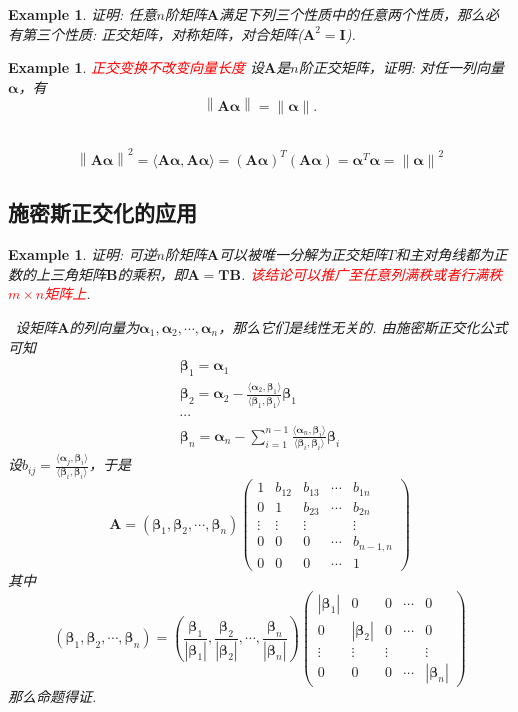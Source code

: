 \documentclass{article}
\newtheorem{example}[theorem]{Example}
\newcommand{\norm}[1]{\left\lVert#1\right\rVert} %
\newcommand{\hints}{{\color{blue} \text{hints}}}
\newcommand{\mbf}[1]{\bm{#1}}
\newcommand\inp[2]{\langle #1, #2 \rangle} %
\newcommand{\redt}[1]{\textcolor{red}{#1}}
\begin{document}
\begin{example}
\rm 证明: 任意$n$阶矩阵$\mbf{A}$满足下列三个性质中的任意两个性质，那么必有第三个性质: 正交矩阵，对称矩阵，对合矩阵($\mbf{A}^2 = \mbf{I}$). 
\end{example}

\begin{example}
\rm \redt{正交变换不改变向量长度} 设$\mbf{A}$是$n$阶正交矩阵，证明: 对任一列向量$\mbf{\alpha}$，有
$$
\norm{\mbf{A}\mbf{\alpha}} = \norm{\mbf{\alpha}}.
$$

\hints\ 
$$
\norm{\mbf{A}\mbf{\alpha}}^2 = \inp{\mbf{A}\mbf{\alpha}}{\mbf{A}\mbf{\alpha}} = (\mbf{A}\mbf{\alpha})^T(\mbf{A}\mbf{\alpha}) = \mbf{\alpha}^T\mbf{\alpha} = \norm{\mbf{\alpha}}^2
$$
\end{example}

\subsection{施密斯正交化的应用}
\begin{example}
\rm 证明: 可逆$n$阶矩阵$\mbf{A}$可以被唯一分解为正交矩阵$T$和主对角线都为正数的上三角矩阵$\mbf{B}$的乘积，即$\mbf{A} = \mbf{T}\mbf{B}$. \redt{该结论可以推广至任意列满秩或者行满秩$m \times n$矩阵上}. 

\hints\ 设矩阵$\mbf{A}$的列向量为$\mbf{\alpha}_1,\mbf{\alpha}_2,\cdots,\mbf{\alpha}_n$，那么它们是线性无关的. 由施密斯正交化公式可知
$$
\begin{array}{ll}
\mbf{\beta}_1 = \mbf{\alpha}_1 \\
\mbf{\beta}_2 = \mbf{\alpha}_2 - \frac{\inp{\mbf{\alpha}_2}{\mbf{\beta}_1}}{\inp{\mbf{\beta}_1}{\mbf{\beta}_1}}\mbf{\beta}_1\\
\cdots \\
\mbf{\beta}_n = \mbf{\alpha}_n - \sum\limits_{i=1}^{n-1}\frac{\inp{\mbf{\alpha}_n}{\mbf{\beta}_i}}{\inp{\mbf{\beta}_i}{\mbf{\beta}_i}}\mbf{\beta}_i
\end{array}
$$
设$b_{ij} = \frac{\inp{\mbf{\alpha}_j}{\mbf{\beta}_i}}{\inp{\mbf{\beta}_i}{\mbf{\beta}_i}}$，于是
$$
\mbf{A} = (\mbf{\beta}_1,\mbf{\beta}_2,\cdots,\mbf{\beta}_n)
\begin{pmatrix}
1 & b_{12} & b_{13} & \cdots & b_{1n} \\
0 & 1 & b_{23} & \cdots & b_{2n} \\
\vdots & \vdots & \vdots &  & \vdots\\
0 & 0 & 0 & \cdots & b_{n-1,n} \\
0 & 0 & 0 & \cdots & 1 
\end{pmatrix}
$$
其中
$$
\left(\mbf{\beta}_1,\mbf{\beta}_2,\cdots,\mbf{\beta}_n \right) = \left(\frac{\mbf{\beta}_1}{|\mbf{\beta}_1|},\frac{\mbf{\beta}_2}{|\mbf{\beta}_2|},\cdots,\frac{\mbf{\beta}_n}{|\mbf{\beta}_n|}\right)\begin{pmatrix}
|\mbf{\beta}_1| & 0 & 0 & \cdots & 0 \\
0 & |\mbf{\beta}_2| & 0 & \cdots & 0 \\
\vdots & \vdots & \vdots &  & \vdots \\ 
0 & 0 & 0 & \cdots & |\mbf{\beta}_n|
\end{pmatrix}
$$
那么命题得证. 
\end{example}
\end{document}
